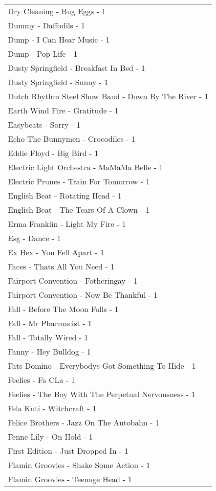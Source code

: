 \documentclass[
]{article}
\begin{document}
\begin{longtable}{l}
Dry Cleaning - Bug Eggs - 1 \\ 
Dummy - Daffodils - 1 \\ 
Dump - I Can Hear Music - 1 \\ 
Dump - Pop Life - 1 \\ 
Dusty Springfield - Breakfast In Bed - 1 \\ 
Dusty Springfield - Sunny - 1 \\ 
Dutch Rhythm Steel Show Band - Down By The River - 1 \\ 
Earth Wind Fire - Gratitude - 1 \\ 
Easybeats - Sorry - 1 \\ 
Echo The Bunnymen - Crocodiles - 1 \\ 
Eddie Floyd - Big Bird - 1 \\ 
Electric Light Orchestra - MaMaMa Belle - 1 \\ 
Electric Prunes - Train For Tomorrow - 1 \\ 
English Beat - Rotating Head - 1 \\ 
English Beat - The Tears Of A Clown - 1 \\ 
Erma Franklin - Light My Fire - 1 \\ 
Esg - Dance - 1 \\ 
Ex Hex - You Fell Apart - 1 \\ 
Faces - Thats All You Need - 1 \\ 
Fairport Convention - Fotheringay - 1 \\ 
Fairport Convention - Now Be Thankful - 1 \\ 
Fall - Before The Moon Falls - 1 \\ 
Fall - Mr Pharmacist - 1 \\ 
Fall - Totally Wired - 1 \\ 
Fanny - Hey Bulldog - 1 \\ 
Fats Domino - Everybodys Got Something To Hide - 1 \\ 
Feelies - Fa CLa - 1 \\ 
Feelies - The Boy With The Perpetual Nervousness - 1 \\ 
Fela Kuti - Witchcraft - 1 \\ 
Felice Brothers - Jazz On The Autobahn - 1 \\ 
Fenne Lily - On Hold - 1 \\ 
First Edition - Just Dropped In - 1 \\ 
Flamin Groovies - Shake Some Action - 1 \\ 
Flamin Groovies - Teenage Head - 1 \\ 

\end{longtable}
\end{document}
